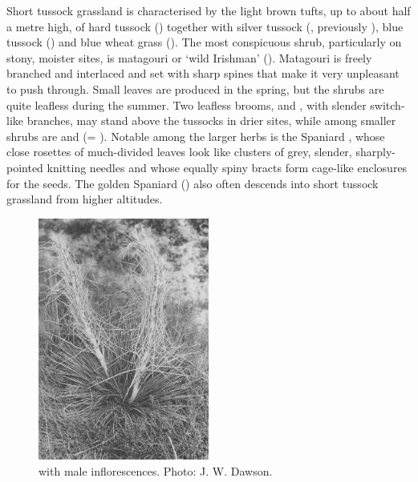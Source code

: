 Short tussock grassland is characterised by the light brown tufts, up to about half a metre high, of hard tussock () together with silver tussock (, previously ), blue tussock () and blue wheat grass ().
The most conspicuous shrub, particularly on stony, moister sites, is matagouri or `wild Irishman' ().
Matagouri is freely branched and interlaced and set with sharp spines that make it very unpleasant to push through.
Small leaves are produced in the spring, but the shrubs are quite leafless during the summer.
Two leafless brooms,  and , with slender switch-like branches, may stand above the tussocks in drier sites, while among smaller shrubs are  and  (= ).
Notable among the larger herbs is the Spaniard , whose close rosettes of much-divided leaves look like clusters of grey, slender, sharply-pointed knitting needles and whose equally spiny bracts form cage-like enclosures for the seeds.
The golden Spaniard () also often descends into short tussock grassland from higher altitudes.

\begin{figure}
	\includegraphics[width=0.5\textwidth]{graphics/figure84aciphylla.jpg}
	\centering
	\caption[Aciphylla subflabellata with male inflorescencs]{ with male inflorescences.
	Photo:  J. W. Dawson.}%
	\label{fig:84aciphylla}
\end{figure}

